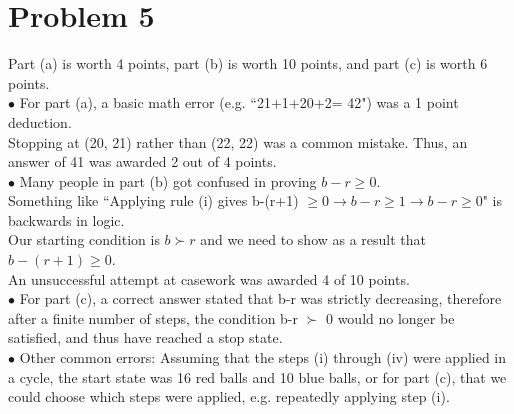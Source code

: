 \documentclass{article}
\begin{document}
\section*{Problem 5}
Part (a) is worth 4 points, part (b) is worth 10 points, and part (c) is worth 6 points. 
\\ $\bullet$ For part (a), a basic math error (e.g. ``21+1+20+2= 42") was a 1 point deduction.
\\Stopping at (20, 21) rather than (22, 22) was a common mistake. Thus, an answer of 41 was awarded 2 out of 4 points.
\\ $\bullet$ Many people in part (b) got confused in proving $b-r \geq 0$. 
\\Something like ``Applying rule (i) gives b-(r+1) $\geq 0 \rightarrow b-r \geq 1 \rightarrow b-r \geq 0$" is backwards in logic. 
\\Our starting condition is $b \succ r$ and we need to show as a result that $b - (r+1) \geq 0$.  
\\An unsuccessful attempt at casework was awarded 4 of 10 points.  
\\ $\bullet$ For part (c), a correct answer stated that b-r was strictly decreasing, therefore after a finite number of steps, the condition b-r $\succ$ 0 would no longer be satisfied, and thus have reached a stop state.   
\\ $\bullet$ Other common errors: Assuming that the steps (i) through (iv) were applied in a cycle, the start state was 16 red balls and 10 blue balls, or for part (c), that we could choose which steps were applied, e.g. repeatedly applying step (i).  
\end{document}

